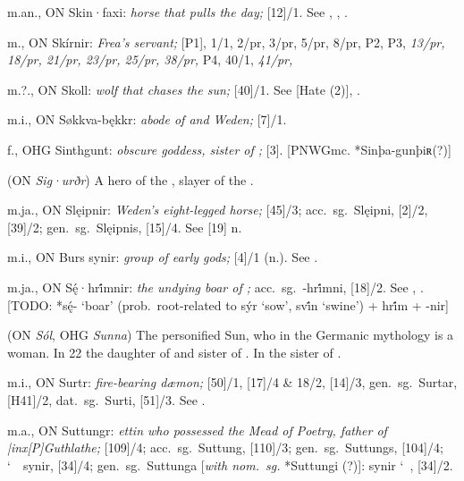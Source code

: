 \begin{itemize}
 m.an., ON Skin·faxi:
  \emph{horse that pulls the day;} [12]/1.  See , , .

 m., ON Skírnir:
  \emph{Frea’s servant;} [P1], 1/1, 2/pr, 3/pr, 5/pr, 8/pr, P2, P3, \emph{13/pr, 18/pr, 21/pr, 23/pr, 25/pr, 38/pr,} P4, 40/1, \emph{41/pr,}

 m.?., ON Skoll:
  \emph{wolf that chases the sun;} [40]/1.  See [Hate (2)], .

 m.i., ON Søkkva-bękkr:
  \emph{abode of  and Weden;} [7]/1.

 f., OHG Sinthgunt:
  \emph{obscure goddess, sister of ;} [3].
  [PNWGmc. *Sinþa-gunþiʀ(?)]

 (ON \emph{Sig·urðr})
  A hero of the , slayer of the  .

 m.ja., ON Slęipnir:
  \emph{Weden’s eight-legged horse;} [45]/3; acc.~sg.~Slęipni, [2]/2, [39]/2; gen.~sg.~Slęipnis, [15]/4.  See [19] n.

 m.i., ON Burs synir:
  \emph{group of early gods;} [4]/1 (n.).  See .

 m.ja., ON Sę́·hri̇́mnir:
  \emph{the undying boar of ;} acc.~sg.~-hri̇́mni, [18]/2.  See , .
  [TODO: *sę́- ‘boar’ (prob.~root-related to sýr ‘sow’, svi̇́n ‘swine’) + hri̇́m + -nir]

 (ON \emph{Sól}, OHG \emph{Sunna})
  The personified Sun, who in the Germanic mythology is a woman.  In  22 the daughter of  and sister of .  In  the sister of .

 m.i., ON Surtr:
  \emph{fire-bearing dæmon;} [50]/1, [17]/4 \& 18/2, [14]/3, gen.~sg.~Surtar, [H41]/2, dat.~sg.~Surti, [51]/3.  See .

 m.a., ON Suttungr:
  \emph{ettin who possessed the Mead of Poetry, father of |inx[P]{Guthlathe};} [109]/4; acc.~sg.~Suttung, [110]/3; gen.~sg.~Suttungs, [104]/4; \char`~\ synir, [34]/4; gen.~sg.~Suttunga [\emph{with nom.~sg.} *Suttungi (?)]: synir \char`~, [34]/2.


\end{itemize}
